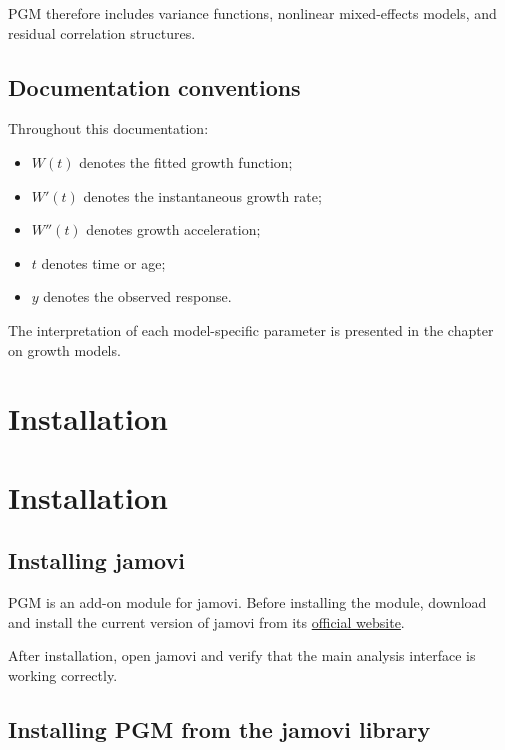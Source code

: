 \documentclass[
  english,
  letterpaper,
  DIV=11,
  numbers=noendperiod]{scrreprt}
\providecommand{\tightlist}{%
  \setlength{\itemsep}{0pt}\setlength{\parskip}{0pt}}
\begin{document}
PGM therefore includes variance functions, nonlinear mixed-effects
models, and residual correlation structures.

\section{Documentation conventions}\label{documentation-conventions}

Throughout this documentation:

\begin{itemize}
\tightlist
\item
  \(W(t)\) denotes the fitted growth function;
\item
  \(W'(t)\) denotes the instantaneous growth rate;
\item
  \(W''(t)\) denotes growth acceleration;
\item
  \(t\) denotes time or age;
\item
  \(y\) denotes the observed response.
\end{itemize}

The interpretation of each model-specific parameter is presented in the
chapter on growth models.


\chapter{Installation}\label{installation}


\chapter{Installation}\label{installation-1}

\section{Installing jamovi}\label{installing-jamovi}

PGM is an add-on module for jamovi. Before installing the module,
download and install the current version of jamovi from its
\href{https://www.jamovi.org/download.html}{official website}.

After installation, open jamovi and verify that the main analysis
interface is working correctly.

\section{Installing PGM from the jamovi
library}\label{installing-pgm-from-the-jamovi-library}
\end{document}
